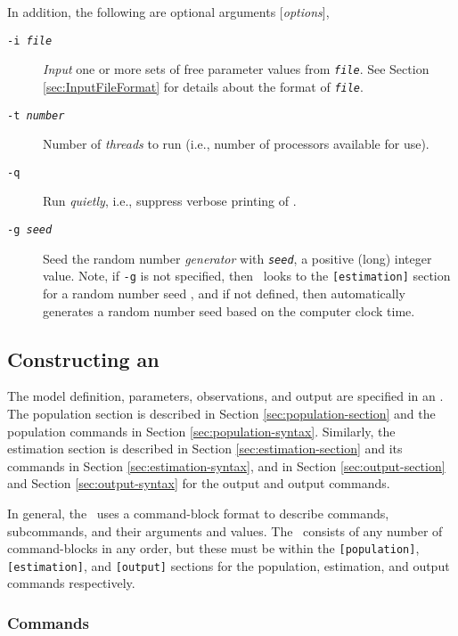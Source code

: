 In addition, the following are optional arguments [\emph{options}],

\begin{description}
\item [\texttt{-i \emph{file}}] \emph{Input} one or more sets of free parameter values from \texttt{\emph{file}}. See Section \ref{sec:InputFileFormat} for details about the format of \texttt{\emph{file}}.

\item [\texttt{-t \emph{number}}] Number of \emph{threads} to run (i.e., number of processors available for use).

\item [\texttt{-q}] Run \emph{quietly}, i.e., suppress verbose printing of \SPM.

\item [\texttt{-g \emph{seed}}]  Seed the random number \emph{generator} with \texttt{\emph{seed}}, a positive (long) integer value. Note, if \texttt{-g} is not specified, then \SPM\ looks to the \texttt{[estimation]} section for a random number seed , and if not defined, then automatically generates a random number seed based on the computer clock time.
\end{description}

\subsection{Constructing an \SPM\ \config \label{constructing-spm-config}}

The model definition, parameters, observations, and output are specified in an \config. The  population section is described in Section \ref{sec:population-section} and the population commands in Section \ref{sec:population-syntax}. Similarly, the estimation section is described in Section \ref{sec:estimation-section} and its commands in Section \ref{sec:estimation-syntax}, and in Section \ref{sec:output-section} and Section \ref{sec:output-syntax} for the output and output commands. 

In general, the \config\ uses a command-block format to describe commands, subcommands, and their arguments and values. The \config\ consists of any number of command-blocks in any order, but these must be within the \texttt{[population]}, \texttt{[estimation]}, and  \texttt{[output]} sections for the population, estimation, and output commands respectively. 

\subsubsection{Commands}

